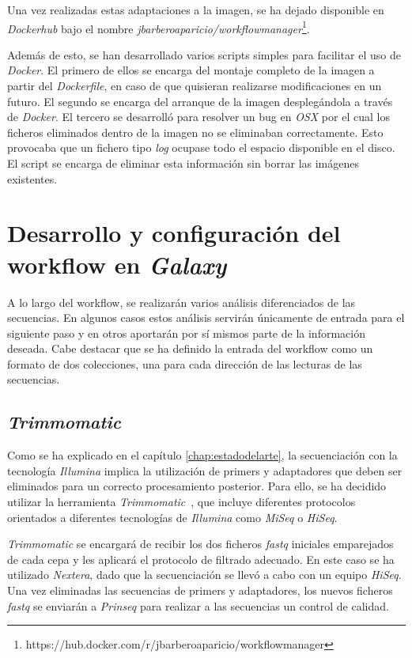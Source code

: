 Una vez realizadas estas adaptaciones a la imagen, se ha dejado disponible en \textit{Dockerhub} bajo el nombre \textit{jbarberoaparicio/workflowmanager}\footnote{https://hub.docker.com/r/jbarberoaparicio/workflowmanager}. 

Además de esto, se han desarrollado varios scripts simples para facilitar el uso de \textit{Docker}. El primero de ellos se encarga del montaje completo de la imagen a partir del \textit{Dockerfile}, en caso de que quisieran realizarse modificaciones en un futuro. El segundo se encarga del arranque de la imagen desplegándola a través de \textit{Docker}. El tercero se desarrolló para resolver un bug en \textit{OSX} por el cual los ficheros eliminados dentro de la imagen no se eliminaban correctamente. Esto provocaba que un fichero tipo \textit{log} ocupase todo el espacio disponible en el disco. El script se encarga de eliminar esta información sin borrar las imágenes existentes.


\section{Desarrollo y configuración del workflow en \itshape{Galaxy}}
A lo largo del workflow, se realizarán varios análisis diferenciados de las secuencias. En algunos casos estos análisis servirán  únicamente de entrada para el siguiente paso y en otros aportarán por sí mismos parte de la información deseada. 
Cabe destacar que se ha definido la entrada del workflow como un formato de dos colecciones, una para cada dirección de las lecturas de las secuencias. 

\subsection{\itshape{Trimmomatic}}
Como se ha explicado en el capítulo \ref{chap:estadodelarte}, la secuenciación con la tecnología \textit{Illumina} implica la utilización de primers y adaptadores que deben ser eliminados para un correcto procesamiento posterior. Para ello, se ha decidido utilizar la herramienta \textit{Trimmomatic}~\cite{Bolger2014}, que incluye diferentes protocolos orientados a diferentes tecnologías de \textit{Illumina} como \textit{MiSeq} o \textit{HiSeq}.

\textit{Trimmomatic} se encargará de recibir los dos ficheros \textit{fastq} iniciales emparejados de cada cepa y les aplicará el protocolo de filtrado adecuado. En este caso se ha utilizado \textit{Nextera}, dado que la secuenciación se llevó a cabo con un equipo \textit{HiSeq}. Una vez eliminadas las secuencias de primers y adaptadores, los nuevos ficheros \textit{fastq} se enviarán a \textit{Prinseq} para realizar a las secuencias un control de calidad.

